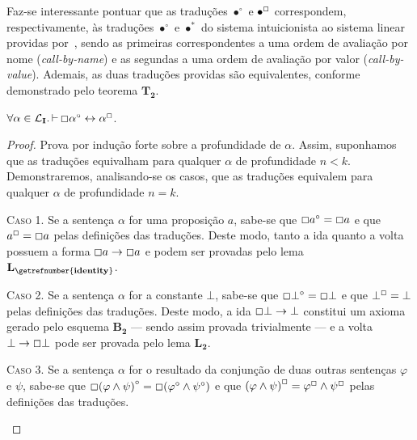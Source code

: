     Faz-se interessante pontuar que as traduções $\bullet^\circ$ e $\bullet^\Box$ correspondem, respectivamente, às traduções $\bullet^\circ$ e $\bullet^*$ do sistema intuicionista ao sistema linear providas por~\cite{Girard}, sendo as primeiras correspondentes a uma ordem de avaliação por nome (\textit{call-by-name}) e as segundas a uma ordem de avaliação por valor (\textit{call-by-value}). 
    Ademais, as duas traduções providas são equivalentes, conforme demonstrado pelo teorema $\mathbf{T_2}$.

    \begin{theorem}
        $\forall\alpha\in\mathcal{L}_\mathbf{I}\mathpunct{.}\mathop{\vdash}\Box\alpha^\circ\leftrightarrow\alpha^\Box$.

        \begin{proof}
            Prova por indução forte sobre a profundidade de $\alpha$.
            Assim, suponhamos que as traduções equivalham para qualquer $\alpha$ de profundidade $n<k$.
            Demonstraremos, analisando-se os casos, que as traduções equivalem para qualquer $\alpha$ de profundidade $n=k$.
    
            \begin{case}
                \textsc{Caso 1.}
                Se a sentença $\alpha$ for uma proposição $a$, sabe-se que $\Box a^\circ=\Box a$ e que $a^\Box =\Box a$ pelas definições das traduções.
                Deste modo, tanto a ida quanto a volta possuem a forma $\Box a\to\Box a$ e podem ser provadas pelo lema \hyperref[identity]{$\mathbf{L_\getrefnumber{identity}}$}.
            \end{case}

            \begin{case}
                \textsc{Caso 2.}
                Se a sentença $\alpha$ for a constante $\bot$, sabe-se que $\Box\bot^\circ=\Box\bot$ e que $\bot^\Box=\bot$ pelas definições das traduções.
                Deste modo, a ida $\Box\bot\to\bot$ constitui um axioma gerado pelo esquema $\mathbf{B_2}$ --- sendo assim provada trivialmente --- e a volta $\bot\to\Box\bot$ pode ser provada pelo lema \hyperref[explosion]{$\mathbf{L_2}$}.
            \end{case}
    
            \begin{case}
                \textsc{Caso 3.}
                Se a sentença $\alpha$ for o resultado da conjunção de duas outras sentenças $\varphi$ e $\psi$, sabe-se que $\Box{(\varphi\wedge\psi)}^\circ=\Box(\varphi^\circ\wedge\psi^\circ)$ e que ${(\varphi\wedge\psi)}^\Box=\varphi^\Box\wedge\psi^\Box$ pelas definições das traduções.
            \end{case}


\end{proof}
\end{theorem}
